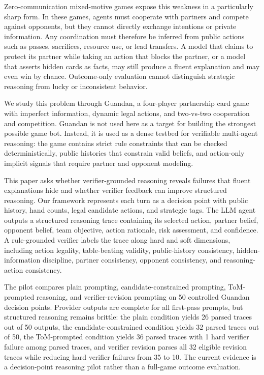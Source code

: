 \documentclass[sigconf,anonymous,review]{acmart}
\begin{document}
Zero-communication mixed-motive games expose this weakness in a particularly sharp form. In these games, agents must cooperate with partners and compete against opponents, but they cannot directly exchange intentions or private information. Any coordination must therefore be inferred from public actions such as passes, sacrifices, resource use, or lead transfers. A model that claims to protect its partner while taking an action that blocks the partner, or a model that asserts hidden cards as facts, may still produce a fluent explanation and may even win by chance. Outcome-only evaluation cannot distinguish strategic reasoning from lucky or inconsistent behavior.

We study this problem through Guandan, a four-player partnership card game with imperfect information, dynamic legal actions, and two-vs-two cooperation and competition. Guandan is not used here as a target for building the strongest possible game bot. Instead, it is used as a dense testbed for verifiable multi-agent reasoning: the game contains strict rule constraints that can be checked deterministically, public histories that constrain valid beliefs, and action-only implicit signals that require partner and opponent modeling.

This paper asks whether verifier-grounded reasoning reveals failures that fluent explanations hide and whether verifier feedback can improve structured reasoning. Our framework represents each turn as a decision point with public history, hand counts, legal candidate actions, and strategic tags. The LLM agent outputs a structured reasoning trace containing its selected action, partner belief, opponent belief, team objective, action rationale, risk assessment, and confidence. A rule-grounded verifier labels the trace along hard and soft dimensions, including action legality, table-beating validity, public-history consistency, hidden-information discipline, partner consistency, opponent consistency, and reasoning-action consistency.

The pilot compares plain prompting, candidate-constrained prompting, ToM-prompted reasoning, and verifier-revision prompting on 50 controlled Guandan decision points. Provider outputs are complete for all first-pass prompts, but structured reasoning remains brittle: the plain condition yields 26 parsed traces out of 50 outputs, the candidate-constrained condition yields 32 parsed traces out of 50, the ToM-prompted condition yields 36 parsed traces with 1 hard verifier failure among parsed traces, and verifier revision parses all 32 eligible revision traces while reducing hard verifier failures from 35 to 10. The current evidence is a decision-point reasoning pilot rather than a full-game outcome evaluation.
\end{document}
